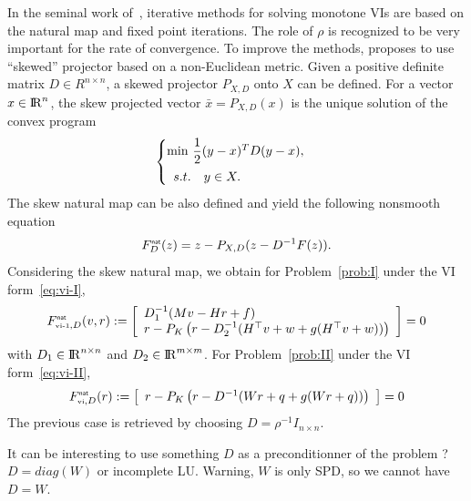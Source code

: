 In the seminal work of~\cite{Sibony1970}, iterative methods for solving monotone VIs are based on the natural map and fixed point iterations. The role of $\rho$ is recognized to be very important for the rate of convergence. To improve the methods, \citet{Sibony1970} proposes to use ``skewed'' projector based on a non-Euclidean metric. Given a positive definite matrix $D\in R^{n\times n}$, a skewed projector $P_{X,D}$ onto $X$ can be defined. For a vector $x\in \mathrm{I\!R}^n$, the skew projected vector $\bar x  = P_{X,D}(x)$ is the unique solution of the convex program
\begin{equation}
  \label{eq:opt-proj-skew}
  \begin{cases}
    \min\, \Frac 1 2 (y-x)^T D (y-x), \\[2mm]
    \begin{array}{ll}
    s.t. & y \in X .
  \end{array}
  \end{cases}
\end{equation} 
The skew natural map can be also defined and yield the following nonsmooth equation
\begin{equation}
  \label{eq:skew-natural-NE}
   F_D^\nat(z) = z - P_{X,D}(z-D^{-1} F(z)).
\end{equation}
Considering the skew natural map, we obtain for Problem~\ref{prob:I} under the VI form~\eqref{eq:vi-I},
\begin{equation}
  \label{eq:natural-typeI}
  F_{\vione,D}^\nat(v,r) := \left[
  \begin{array}{l}
    D_1^{-1} (Mv - Hr + f) \\ 
    r - P_{K}\left(r  - D_2^{-1} (H^\top v + w  + g(H^\top v + w))\right)
  \end{array}\right] = 0
\end{equation}
with $D_1\in \mathrm{I\!R}^{n\times n}$ and $D_2\in \mathrm{I\!R}^{m\times m}$.
For Problem~\ref{prob:II} under the VI form~\eqref{eq:vi-II},
\begin{equation}
  \label{eq:natural-typeII}
  F_{\vitwo,D}^\nat(r) := \left[
  \begin{array}{l} 
    r - P_{K}\left(r  - D^{-1} ( W r +q   + g(Wr+q))\right)  \end{array}\right] = 0
\end{equation}
The previous case is retrieved by choosing $D = \rho^{-1} I_{n\times n}$. 





\begin{ndrva}
  It can be interesting to use something $D$ as a preconditionner of the problem ? $D=diag(W)$ or incomplete LU. Warning, $W$ is only SPD, so we cannot have $D =W$.
\end{ndrva}

